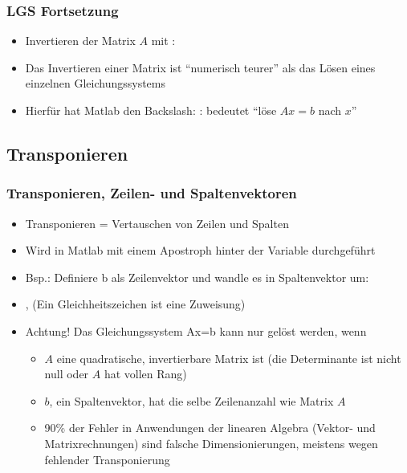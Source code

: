     \begin{frame}
        \frametitle{LGS Fortsetzung}
        \begin{itemize}
            \item Invertieren der Matrix $A$ mit : 
            \item Das Invertieren einer Matrix ist ``numerisch teurer'' als das Lösen eines einzelnen Gleichungssystems
            \item Hierfür hat Matlab den Backslash: : bedeutet ``löse $Ax=b$ nach $x$''
        \end{itemize}
    \end{frame}

    \subsection{Transponieren}
    \begin{frame}
        \frametitle{Transponieren, Zeilen- und Spaltenvektoren}
        \begin{itemize}
            \item Transponieren = Vertauschen von Zeilen und Spalten
            \item Wird in Matlab mit einem Apostroph hinter der Variable durchgeführt
            \item Bsp.: Definiere b als Zeilenvektor und wandle es in Spaltenvektor um:
            \item {}, (Ein Gleichheitszeichen ist eine Zuweisung)
            \item \alert{Achtung!} Das Gleichungssystem Ax=b kann nur gelöst werden, wenn
            \begin{itemize}
                \item $A$ eine quadratische, invertierbare Matrix ist (die Determinante ist nicht null oder $A$ hat vollen Rang)
                \item $b$, ein Spaltenvektor, hat die selbe Zeilenanzahl wie Matrix $A$
                \item 90\% der Fehler in Anwendungen der linearen Algebra (Vektor- und Matrixrechnungen) sind falsche Dimensionierungen,
                meistens wegen fehlender Transponierung
            \end{itemize}
        \end{itemize}
    \end{frame}

